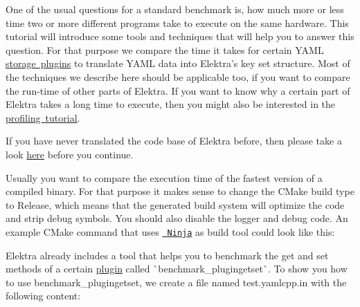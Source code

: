 One of the usual questions for a standard benchmark is, how much more or less time two or more different programs take to execute on the same hardware. This tutorial will introduce some tools and techniques that will help you to answer this question. For that purpose we compare the time it takes for certain Y\+A\+ML \mbox{\hyperlink{doc_tutorials_storage-plugins_md}{storage plugins}} to translate Y\+A\+ML data into Elektra’s key set structure. Most of the techniques we describe here should be applicable too, if you want to compare the run-\/time of other parts of Elektra. If you want to know why a certain part of Elektra takes a long time to execute, then you might also be interested in the \mbox{\hyperlink{doc_tutorials_profiling_md}{profiling tutorial}}.

If you have never translated the code base of Elektra before, then please take a look \mbox{\hyperlink{doc_COMPILE_md}{here}} before you continue.

Usually you want to compare the execution time of the fastest version of a compiled binary. For that purpose it makes sense to change the C\+Make build type to {\ttfamily Release}, which means that the generated build system will optimize the code and strip debug symbols. You should also disable the logger and debug code. An example C\+Make command that uses \href{https://ninja-build.org}{\texttt{ Ninja}} as build tool could look like this\+:


\begin{DoxyCode}{0}
\end{DoxyCode}


Elektra already includes a tool that helps you to benchmark the {\ttfamily get} and {\ttfamily set} methods of a certain \mbox{\hyperlink{doc_tutorials_plugins_md}{plugin}} called \`{}benchmark\+\_\+plugingetset\`{}. To show you how to use {\ttfamily benchmark\+\_\+plugingetset}, we create a file named {\ttfamily test.\+yamlcpp.\+in} with the following content\+:


\begin{DoxyCode}{0}
\end{DoxyCode}



